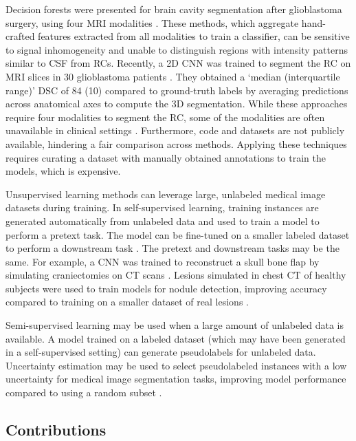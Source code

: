 Decision forests were presented for brain cavity segmentation after glioblastoma surgery, using four \ac{MRI} modalities \cite{meier_automatic_2017}.
These methods, which aggregate hand-crafted features extracted from all  modalities to train a classifier, can be sensitive to signal inhomogeneity and unable to distinguish regions with intensity patterns similar to \ac{CSF} from \acp{RC}.
Recently, a 2D \ac{CNN} was trained to segment the \ac{RC} on \ac{MRI} slices in 30 glioblastoma patients \cite{ermis_fully_2020}.
They obtained a `median (interquartile range)' \ac{DSC} of 84 (10) compared to ground-truth labels by averaging predictions across anatomical axes to compute the 3D segmentation.
While these approaches require four modalities to segment the \ac{RC}, some of the modalities are often unavailable in clinical settings \cite{dorent_learning_2021}.
Furthermore, code and datasets are not publicly available, hindering a fair comparison across methods.
Applying these techniques requires curating a dataset with manually obtained annotations to train the models, which is expensive.

Unsupervised learning methods can leverage large, unlabeled medical image datasets during training.
In self-supervised learning, training instances are generated automatically from unlabeled data and used to train a model to perform a pretext task. %
The model can be fine-tuned on a smaller labeled dataset to perform a downstream task \cite{chen_self-supervised_2019}.
The pretext and downstream tasks may be the same.
For example, a \ac{CNN} was trained to reconstruct a skull bone flap by simulating craniectomies on CT scans \cite{matzkin_self-supervised_2020}.
Lesions simulated in chest CT of healthy subjects were used to train models for nodule detection, improving accuracy compared to training on a smaller dataset of real lesions \cite{pezeshk_seamless_2017}.

Semi-supervised learning may be used when a large amount of unlabeled data is available.
A model trained on a labeled dataset (which may have been generated in a self-supervised setting) can generate pseudolabels for unlabeled data.
Uncertainty estimation may be used to select pseudolabeled instances with a low uncertainty for medical image segmentation tasks, improving model performance compared to using a random subset \cite{venturini_uncertainty_2020}.


\subsection{Contributions}

